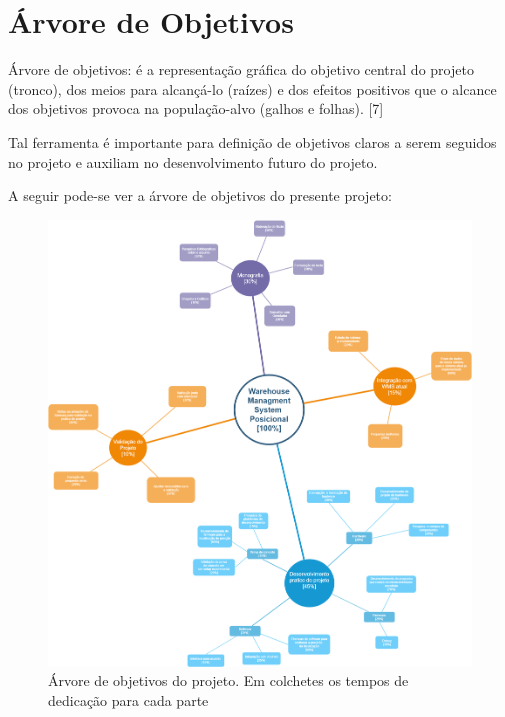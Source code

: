 \chapter{Árvore de Objetivos}
Árvore de objetivos: é a representação gráfica do objetivo central do projeto (tronco), dos meios para alcançá-lo (raízes) e dos efeitos positivos que o alcance dos objetivos provoca na população-alvo (galhos e folhas). [7]

Tal ferramenta é importante para definição de objetivos claros a serem seguidos no projeto e auxiliam no desenvolvimento futuro do projeto.

A seguir pode-se ver a árvore de objetivos do presente projeto:

\begin{figure}
	\includegraphics[width=\linewidth]{images/arvore_objetivos.png}
	\caption{Árvore de objetivos do projeto. Em colchetes os tempos de dedicação para cada parte}
	\label{fig:arvore_objetivos}
  \end{figure}